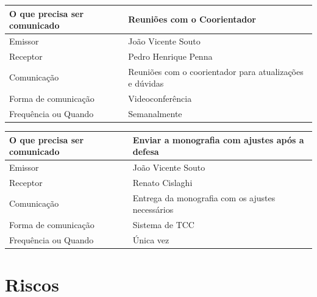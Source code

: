 \documentclass[
	12pt,				%
	openright,			%
	twoside,			%
	a4paper,			%
	english,			%
	brazil,				%
	]{abntex2}
\begin{document}
\begin{center}
\begin{tabular}{|l|p{9cm}|}
\hline
    O que precisa ser comunicado & Reuniões com o Coorientador \\ \hline
    Emissor & João Vicente Souto \\ \hline
    Receptor & Pedro Henrique Penna \\ \hline
    Comunicação & Reuniões com o coorientador para atualizações e dúvidas \\ \hline
    Forma de comunicação & Videoconferência \\ \hline
    Frequência ou Quando & Semanalmente \\ \hline
\end{tabular}
\end{center}

\begin{center}
\begin{tabular}{|l|p{9cm}|}
\hline
    O que precisa ser comunicado & Enviar a monografia com ajustes após a defesa \\ \hline
    Emissor & João Vicente Souto \\ \hline
    Receptor & Renato Cislaghi \\ \hline
    Comunicação & Entrega da monografia com os ajustes necessários \\ \hline
    Forma de comunicação & Sistema de TCC \\ \hline
    Frequência ou Quando & Única vez \\ \hline
\end{tabular}
\end{center}

\newpage
\section{Riscos}
\end{document}
